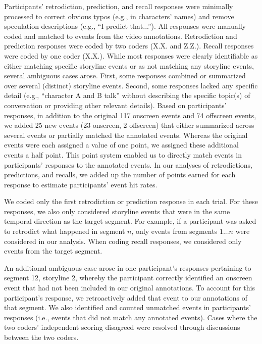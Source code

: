 \documentclass[10pt]{article}
\begin{document}
Participants' retrodiction, prediction, and recall responses were minimally
processed to correct obvious typos (e.g., in characters’ names) and remove
speculation descriptions (e.g., ``I predict that...''). All responses were
manually coded and matched to events from the video annotations. Retrodiction
and prediction responses were coded by two coders (X.X. and Z.Z.). Recall
responses were coded by one coder (X.X.). While most responses were clearly
identifiable as either matching specific storyline events or as not matching
any storyline events, several ambiguous cases arose. First, some responses
combined or summarized over several (distinct) storyline events. Second, some
responses lacked any specific detail (e.g., ``character A and B talk'' without
describing the specific topic(s) of conversation or providing other relevant
details). Based on participants' responses, in addition to the original 117
onscreen events and 74 offscreen events, we added 25 new events (23 onscreen, 2
offscreen) that either summarized across several events or partially matched
the annotated events. Whereas the original events were each assigned a value of
one point, we assigned these additional events a half point. This point system
enabled us to directly match events in participants' responses to the annotated
events. In our analyses of retrodictions, predictions, and recalls, we added up
the number of points earned for each response to estimate participants' event
hit rates.

We coded only the first retrodiction or prediction response in each trial. For
these responses, we also only considered storyline events that were in the same
temporal direction as the target segment. For example, if a participant was
asked to retrodict what happened in segment $n$, only events from segments
$1...n$ were considered in our analysis. When coding recall responses, we
considered only events from the target segment.

An additional ambiguous case arose in one participant's responses pertaining to
segment 12, storyline 2, whereby the participant correctly identified an
onscreen event that had not been included in our original annotations. To
account for this participant's response, we retroactively added that event to
our annotations of that segment. We also identified and counted unmatched
events in participants' responses (i.e., events that did not match any
annotated events). Cases where the two coders' independent scoring disagreed
were resolved through discussions between the two coders.
\end{document}
